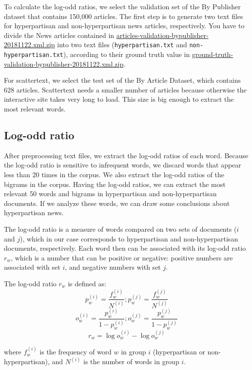 \documentclass[11pt,a4paper]{article}
\begin{document}
To calculate the log-odd ratios, we select the validation set of the By Publisher dataset that contains 150,000 articles. The first step is to generate two text files for hyperpartisan and non-hyperpartisan news articles, respectively. You have to divide the News articles contained in \href{https://zenodo.org/record/5776081/files/articles-validation-bypublisher-20181122.zip?download=1}{articles-validation-bypublisher-20181122.xml.zip} into two text files (\texttt{hyperpartisan.txt} and \texttt{non-hyperpartisan.txt}), according to their ground truth value in \href{https://zenodo.org/record/5776081/files/ground-truth-validation-bypublisher-20181122.zip?download=1}{ground-truth-validation-bypublisher-20181122.xml.zip}.

For scattertext, we select the test set of the By Article Dataset, which contains 628 articles. Scattertext needs a smaller number of articles because otherwise the interactive site takes very long to load. This size is big enough to extract the most relevant words.

\subsection{Log-odd ratio}

After preprocessing text files, we extract the log-odd ratios of each word. Because the log-odd ratio is sensitive to infrequent words, we discard words that appear less than 20 times in the corpus. We also extract the log-odd ratios of the bigrams in the corpus. Having the log-odd ratios, we can extract the most relevant 50 words and bigrams in hyperpartisan and non-hyperpartisan documents. If we analyze these words, we can draw some conclusions about hyperpartisan news.

The log-odd ratio is a measure of words compared on two sets of documents ($i$ and $j$), which in our case corresponds to hyperpartisan and non-hyperpartisan documents, respectively. Each word then can be associated with its log-odd ratio $r_w$, which is a number that can be positive or negative: positive numbers are associated with set $i$, and negative numbers with set $j$.

The log-odd ratio $r_w$ is defined as:
$$p_w^{(i)} = \frac{f_w^{(i)}}{N^{(i)}}; p_w^{(j)} = \frac{f_w^{(j)}}{N^{(j)}}$$
$$o_w^{(i)} = \frac{p_w^{(i)}}{1-p_w^{(i)}}; o_w^{(j)} = \frac{p_w^{(j)}}{1-p_w^{(j)}}$$
$$r_w = \log{o_w^{(i)}} - \log{o_w^{(j)}}$$

where $f_w^{(i)}$ is the frequency of word $w$ in group $i$ (hyperpartisan or non-hyperpartisan), and $N^{(i)}$ is the number of words in group $i$.
\end{document}
